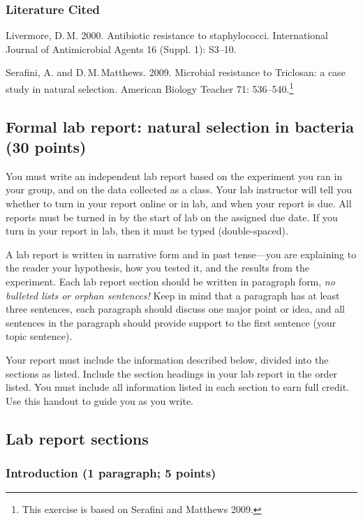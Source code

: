 \documentclass[12pt]{exam}
\newlength{\litindent}
\begin{document}
\subsubsection*{Literature Cited}

Livermore, D.\,M. 2000. Antibiotic resistance to staphylococci. International Journal of Antimicrobial Agents 16 (Suppl. 1): S3–10.

Serafini, A. and D.\,M.\,Matthews. 2009. Microbial resistance to Triclosan: a case study in natural selection. American Biology Teacher 71: 536–540.\footnote{This exercise is based on Serafini and Matthews 2009.}


\subsection*{Formal lab report: natural selection in bacteria (30 points)}

You must write an independent lab report based on
the experiment you ran in your group, and on the data collected as a
class. Your lab instructor will tell you whether to turn in your report online or in lab, and when your report is due. All reports must be turned in by the start of lab on the assigned due date. If you turn in your report in lab, then it must be typed (double-spaced).  

A lab report is written in narrative form and in past tense—you are
explaining to the reader your hypothesis, how you tested it, and the
results from the experiment. Each lab report section should be written
in paragraph form, \emph{no bulleted lists or orphan sentences!} Keep in
mind that a paragraph has at least three sentences, each paragraph should
discuss one major point or idea, and all sentences in the paragraph
should provide support to the first sentence (your topic sentence).

Your report must include the information described below, divided into the
sections as listed. Include the section headings in your lab report in the order listed. You must 
include all information listed in each section to earn full credit. 
Use this handout to guide you as you write.

\subsection*{Lab report sections}

\subsubsection*{Introduction (1 paragraph; 5 points)} 
\end{document}
